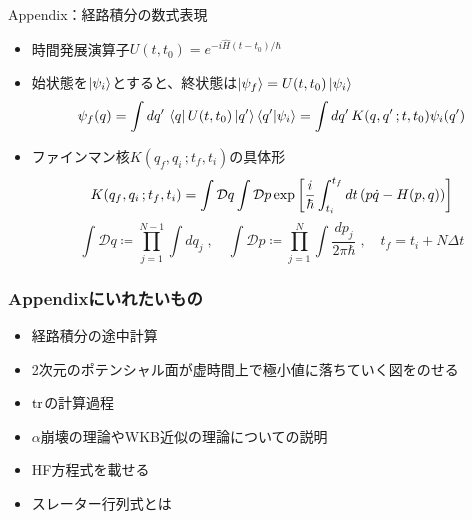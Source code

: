 \documentclass[14pt,aspectratio=169,xcolor=dvipsnames,table,dvipdfmx]{beamer}
\theoremstyle{definition}
\begin{document}
\begin{frame}{Appendix：経路積分の数式表現}
  \begin{itemize}
    \item 時間発展演算子$U(t,t_0)=e^{-i\hat{H}(t-t_0)/\hbar}$
    \item 始状態を$\ket{\psi_i}$とすると、終状態は$\ket{\psi_f}=U(t,t_0)\ket{\psi_i}$
          \begin{equation*}
            \psi_f(q) = \int dq'\,\bra{q}U(t,t_0)\ket{q'}\bra{q'}\ket{\psi_i}
            = \int dq'\,K(q,q'\,;t,t_0)\psi_i(q')
          \end{equation*}
    \item ファインマン核$K(q_f,q_i\,;t_f,t_i)$の具体形
          \begin{equation*}
            K(q_f,q_i\,;t_f,t_i) = \int\mathcal{D}q\int\mathcal{D}p
            \exp\qty[\frac{i}{\hbar}\int_{t_i}^{t_f}dt\,(p\dot{q}-H(p,q))]
          \end{equation*}
          \begin{equation*}
            \int \mathcal{D}q \coloneqq \prod_{j=1}^{N-1} \int dq_j\;,\quad
            \int \mathcal{D}p \coloneqq \prod_{j=1}^N \int \frac{dp_j}{2\pi\hbar}\;,\quad
            t_f = t_i + N\varDelta t
          \end{equation*}
  \end{itemize}
\end{frame}

\begin{frame}
  \frametitle{Appendixにいれたいもの}
  \begin{itemize}
    \item 経路積分の途中計算
    \item 2次元のポテンシャル面が虚時間上で極小値に落ちていく図をのせる
    \item $\trace$の計算過程
    \item $\alpha$崩壊の理論やWKB近似の理論についての説明
    \item HF方程式を載せる
    \item スレーター行列式とは
  \end{itemize}
\end{frame}
\end{document}
